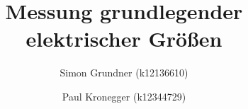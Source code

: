\documentclass[a4paper,oneside,11pt,ngerman]{scrartcl}
\begin{document}
\title{Messung grundlegender elektrischer Größen}
\author{Simon Grundner (k12136610) \and Paul Kronegger (k12344729)}


\tableofcontents





\end{document}
